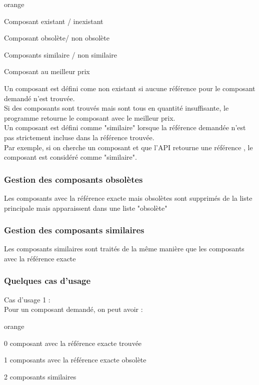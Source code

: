 {\begin{items}{orange}{\Bullet}
\item Composant existant / inexistant
\item Composant obsolète/ non obsolète
\item Composants similaire / non similaire
\item Composant au meilleur prix
\end{items}

Un composant est défini come non existant si aucune référence pour le composant demandé n'est trouvée.\\

Si des composants sont trouvés mais sont tous en quantité insuffisante, le programme retourne le composant avec le meilleur prix.\\

Un composant est défini comme "similaire" lorsque la référence demandée n'est pas strictement incluse dans la référence trouvée.\\
Par exemple, si on cherche un composant  et que l'API retourne une référence , le composant est considéré comme "similaire".


\subsubsection{Gestion des composants obsolètes}
Les composants avec la référence exacte mais obsolètes sont supprimés de la liste principale mais apparaissent dans une liste "obsolète"


\subsubsection{Gestion  des composants similaires}

Les composants similaires sont traités de la même manière que les composants avec la référence exacte

\subsubsection{Quelques cas d'usage}

Cas d'usage 1 : \\


Pour un composant demandé, on peut avoir : 

\begin{items}{orange}{\Bullet}
\item 0 composant avec la référence exacte trouvée
\item 1 composants avec la référence exacte obsolète
\item 2 composants similaires
\end{items}

}
